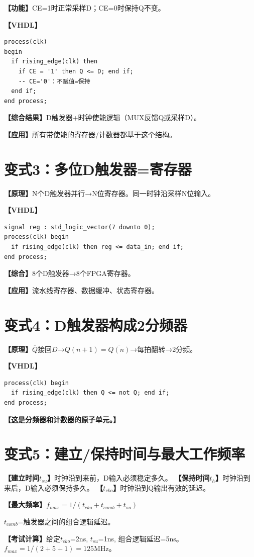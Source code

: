 \begin{detailbox}[完整教学]
\textbf{【功能】}CE=1时正常采样D；CE=0时保持Q不变。

\textbf{【VHDL】}
\begin{lstlisting}
process(clk)
begin
  if rising_edge(clk) then
    if CE = '1' then Q <= D; end if;
    -- CE='0'：不赋值=保持
  end if;
end process;
\end{lstlisting}

\textbf{【综合结果】}D触发器+时钟使能逻辑（MUX反馈Q或采样D）。

\textbf{【应用】}所有带使能的寄存器/计数器都基于这个结构。
\end{detailbox}


\section{变式3：多位D触发器=寄存器}

\begin{detailbox}[完整教学]
\textbf{【原理】}N个D触发器并行→N位寄存器。同一时钟沿采样N位输入。

\textbf{【VHDL】}
\begin{lstlisting}
signal reg : std_logic_vector(7 downto 0);
process(clk) begin
  if rising_edge(clk) then reg <= data_in; end if;
end process;
\end{lstlisting}

\textbf{【综合】}8个D触发器→8个FPGA寄存器。

\textbf{【应用】}流水线寄存器、数据缓冲、状态寄存器。
\end{detailbox}


\section{变式4：D触发器构成2分频器}

\begin{detailbox}[完整教学]
\textbf{【原理】}$\overline{Q}$接回$D$→$Q(n+1)=\overline{Q(n)}$→每拍翻转→2分频。

\textbf{【VHDL】}
\begin{lstlisting}
process(clk) begin
  if rising_edge(clk) then Q <= not Q; end if;
end process;
\end{lstlisting}

\textbf{【这是分频器和计数器的原子单元。】}
\end{detailbox}


\section{变式5：建立/保持时间与最大工作频率}

\begin{detailbox}[完整教学]
\textbf{【建立时间$t_{su}$】}时钟沿到来前，D输入必须稳定多久。
\textbf{【保持时间$t_h$】}时钟沿到来后，D输入必须保持多久。
\textbf{【$t_{cko}$】}时钟沿到Q输出有效的延迟。

\textbf{【最大频率】}$f_{max} = 1/(t_{cko} + t_{comb} + t_{su})$

$t_{comb}$=触发器之间的组合逻辑延迟。

\textbf{【考试计算】}给定$t_{cko}$=2ns, $t_{su}$=1ns, 组合逻辑延迟=5ns。
$f_{max}=1/(2+5+1)=125$MHz。
\end{detailbox}
